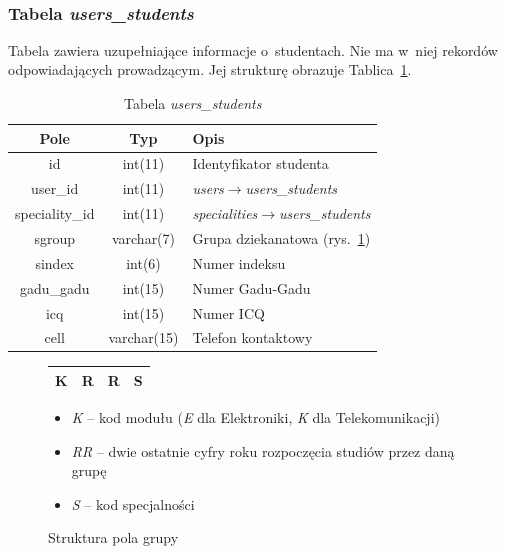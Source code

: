 \documentclass[a4paper,12pt,oneside]{report}
\begin{document}
~\newline

\subsubsection{Tabela \emph{users\_students}}
\label{subsub:users_students}

Tabela zawiera uzupełniające informacje o~studentach. Nie ma w~niej rekordów odpowiadających prowadzącym. Jej strukturę obrazuje Tablica~\ref{tab:users_students}.
\begin{table}[h]
  \centering
  \begin{tabular}{|c|c|l|}\hline
  Pole & Typ & Opis \\\hline
  id             & int(11)     & Identyfikator studenta \\
  user\_id       & int(11)     & \emph{users}$\to$\emph{users\_students}\\
  speciality\_id & int(11)     & \emph{specialities}$\to$\emph{users\_students}\\
  sgroup         & varchar(7)  & Grupa dziekanatowa (rys.~\ref{fig:group})\\
  sindex         & int(6)      & Numer indeksu \\
  gadu\_gadu     & int(15)     & Numer Gadu-Gadu \\
  icq            & int(15)     & Numer ICQ \\
  cell           & varchar(15) & Telefon kontaktowy \\\hline

  \end{tabular}
  \caption{Tabela \emph{users\_students}\label{tab:users_students}}
\end{table}

\begin{figure}[h]
  \centering
  \begin{tabular}{|c|c|c|c|}\hline
  K & R & R & S\\\hline
  \end{tabular}
  \begin{itemize}
    \item \emph{K} -- kod modułu (\emph{E} dla Elektroniki, \emph{K} dla Telekomunikacji)
    \item \emph{RR} -- dwie ostatnie cyfry roku rozpoczęcia studiów przez daną grupę
    \item \emph{S} -- kod specjalności
  \end{itemize}
  \caption{Struktura pola grupy\label{fig:group}}
\end{figure}
\end{document}
